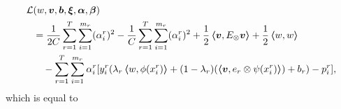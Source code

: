 \begin{equation}\nonumber
    \begin{aligned}
        \mathcal{L} & ({w}, \bm{v}, \bm{b}, \bm{\xi}, {\bm{\alpha}}, \bm{\beta})                                                                                                                                                                    \\
                    & = \frac{1}{2C} \sum_{r=1}^T \sum_{i=1}^{m_r} (\alpha_i^r)^2 - \frac{1}{C} \sum_{r=1}^T \sum_{i=1}^{m_r} (\alpha_i^r)^2 + \frac{1}{2} \bm{\left\langle} \bm{v}, E_\otimes\bm{v} \bm{\right\rangle} + \frac{1}{2} \bm{\left\langle} w, w \bm{\right\rangle}
        \\ &\quad  - \sum_{r=1}^T \sum_{i=1}^{m_r}{ \alpha_i^r [y_{i}^r (\lambda_r \bm{\left\langle} w, \phi(x_i^r) \bm{\right\rangle} + (1 - \lambda_r) (\bm{\left\langle} \bm{v}, e_r \otimes \psi({x}_i^r) \bm{\right\rangle}) + b_r) - p_{i}^r]   } ,\\
    \end{aligned}
\end{equation}
which is equal to
